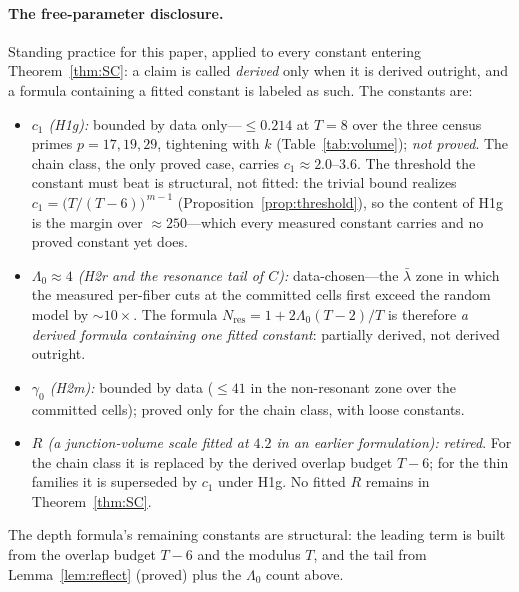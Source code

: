 \paragraph{The free-parameter disclosure.}
Standing practice for this paper, applied to every constant entering
Theorem~\ref{thm:SC}: a claim is called \emph{derived} only when it is
derived outright, and a formula containing a fitted constant is labeled
as such. The constants are:
\begin{itemize}[leftmargin=2.2em,itemsep=2pt,topsep=2pt]
\item \emph{$c_1$ (H1g):} bounded by data only---$\le 0.214$ at $T=8$
  over the three census primes $p=17,19,29$, tightening with $k$
  (Table~\ref{tab:volume}); \emph{not proved}. The chain class, the only
  proved case, carries $c_1\approx 2.0$--$3.6$. The threshold the
  constant must beat is structural, not fitted: the trivial bound
  realizes $c_1=\bigl(T/(T-6)\bigr)^{\,m-1}$
  (Proposition~\ref{prop:threshold}), so the content of H1g is the
  margin over $\approx250$---which every measured constant carries and
  no proved constant yet does.
\item \emph{$\Lambda_0\approx 4$ (H2r and the resonance tail of $C$):}
  data-chosen---the $\bar\lambda$ zone in which the measured per-fiber
  cuts at the committed cells first exceed the random model by
  $\sim 10\times$. The formula
  $N_{\mathrm{res}}=1+2\Lambda_0(T-2)/T$ is therefore \emph{a derived
  formula containing one fitted constant}: partially derived, not
  derived outright.
\item \emph{$\gamma_0$ (H2m):} bounded by data ($\le 41$ in the
  non-resonant zone over the committed cells); proved only for the chain
  class, with loose constants.
\item \emph{$R$ (a junction-volume scale fitted at $4.2$ in an earlier
  formulation):} \emph{retired}. For the chain class it is replaced by
  the derived overlap budget $T-6$; for the thin families it is
  superseded by $c_1$ under H1g. No fitted $R$ remains in
  Theorem~\ref{thm:SC}.
\end{itemize}
The depth formula's remaining constants are structural: the leading
term is built from the overlap budget $T-6$ and the modulus $T$, and
the tail from Lemma~\ref{lem:reflect} (proved) plus the $\Lambda_0$
count above.

